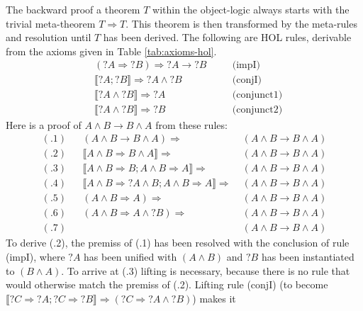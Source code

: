 \begin{expl}
  The backward proof a theorem $T$ within the object-logic always starts with
  the trivial meta-theorem $T \Longrightarrow T$. This theorem is then transformed
  by the meta-rules and resolution until  $T$ has been derived. The following
  are HOL rules, derivable from the axioms given in Table \ref{tab:axioms-hol}. 
  \begin{align*}
    &    (?A \Longrightarrow ?B) \Longrightarrow {}?A \longrightarrow {}?B && \quad \text{(impI)}\\
    & \llbracket?A; {}?B\rrbracket \Longrightarrow {}?A \land{} ?B    & & \quad \text{(conjI)}\\
    & \llbracket?A \land {}?B\rrbracket \Longrightarrow {}?A        && \quad \text{(conjunct1)}\\
    & \llbracket?A \land {}?B\rrbracket \Longrightarrow {}?B       && \quad \text{(conjunct2)}
  \end{align*}
  Here is  a proof of $A\land B \longrightarrow B \land A$ from these rules:
  \begin{align*}
    (.1) &&   (A\land B \longrightarrow B\land A) \Longrightarrow&\; (A\land B \longrightarrow B\land A)       \\
    (.2) &&      \llbracket A\land B \Longrightarrow B\land A\rrbracket \Longrightarrow&\; (A\land B \longrightarrow B\land A)       \\
    (.3) &&     \llbracket A\land B \Longrightarrow B; A\land B \Longrightarrow A\rrbracket \Longrightarrow&\; (A\land B \longrightarrow B\land A) \\
    (.4) &&     \llbracket A\land B \Longrightarrow ?A\land B; A\land B \Longrightarrow A\rrbracket \Longrightarrow&\; (A\land B \longrightarrow B\land A)   \\
    (.5) &&     (A\land B \Longrightarrow A) \Longrightarrow&\; (A\land B \longrightarrow B\land A)      \\
    (.6) &&     (A\land B \Longrightarrow A \land{} ?B) \Longrightarrow&\; (A\land B \longrightarrow B\land A) \\
    (.7) &&     & \;(A\land B \longrightarrow B\land A)
  \end{align*}
  To derive (.2), the premiss of (.1) has been resolved with the conclusion of
  rule (impI), where $?A$ has been unified with $(A\land B)$ and $?B$ has been
  instantiated to $(B\land A)$. To arrive at (.3) lifting is necessary, because there
  is no rule that would otherwise match the premiss of (.2). Lifting rule
  (conjI) (to become $\llbracket?C \Longrightarrow {}?A; ?C \Longrightarrow {}?B\rrbracket \Longrightarrow (?C \Longrightarrow {}?A \land{} ?B)$) makes it

\end{expl}
